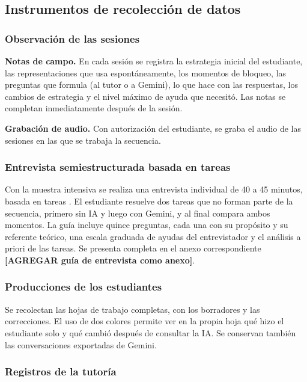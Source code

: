 \subsection{Instrumentos de recolección de datos}

\subsubsection{Observación de las sesiones}

\textbf{Notas de campo.} En cada sesión se registra la estrategia inicial del estudiante, las representaciones que usa espontáneamente, los momentos de bloqueo, las preguntas que formula (al tutor o a Gemini), lo que hace con las respuestas, los cambios de estrategia y el nivel máximo de ayuda que necesitó. Las notas se completan inmediatamente después de la sesión.

\textbf{Grabación de audio.} Con autorización del estudiante, se graba el audio de las sesiones en las que se trabaja la secuencia.

\subsubsection{Entrevista semiestructurada basada en tareas}

Con la muestra intensiva se realiza una entrevista individual de 40 a 45 minutos, basada en tareas \parencite{goldin2000scientific}. El estudiante resuelve dos tareas que no forman parte de la secuencia, primero sin IA y luego con Gemini, y al final compara ambos momentos. La guía incluye quince preguntas, cada una con su propósito y su referente teórico, una escala graduada de ayudas del entrevistador y el análisis a priori de las tareas. Se presenta completa en el anexo correspondiente \textbf{[AGREGAR guía de entrevista como anexo]}.

\subsubsection{Producciones de los estudiantes}

Se recolectan las hojas de trabajo completas, con los borradores y las correcciones. El uso de dos colores permite ver en la propia hoja qué hizo el estudiante solo y qué cambió después de consultar la IA. Se conservan también las conversaciones exportadas de Gemini.

\subsubsection{Registros de la tutoría}

